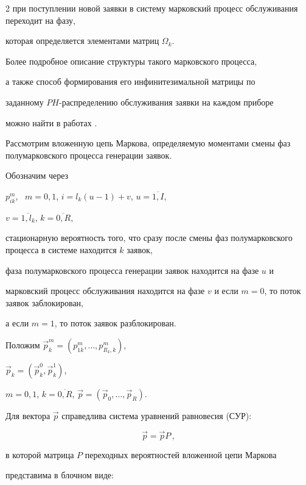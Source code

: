 \begin{multicols}{2}
при поступлении новой заявки в систему марковский процесс обслуживания переходит на фазу,


которая определяется элементами матриц $\Omega_k$.





Более подробное описание структуры такого марковского процесса,


а также способ формирования его инфинитезимальной матрицы по


заданному $PH$-распределению обслуживания заявки на каждом приборе


можно найти в работах \cite{PCh03,PCh04}.





Рассмотрим вложенную цепь Маркова, определяемую моментами смены фаз полумарковского процесса генерации заявок.





Обозначим через


$p^m_{ik}$, \ $m=0,1$,  $i=l_k(u-1)+v$,  $u=\overline{1,I}$,


$v=\overline{1,l_k}$,  $k=\overline{0,R}$,


стационарную вероятность того, что сразу после смены фаз полумарковского процесса в системе находится $k$ заявок,


фаза полумарковского процесса генерации заявок находится на фазе $u$ и


марковский процесс обслуживания находится на фазе $v$ и если $m=0$, то поток заявок заблокирован,


а если $m=1$, то поток заявок разблокирован.


Положим $\vec{p}^m_k=(p^m_{1k},\ldots,p^m_{Il_k,k})$,


$\vec{p}_k = (\vec{p}^0_k,\vec{p}^1_k)$,


 $m=0,1$,  $k=\overline{0,R}$,  $\vec{p}=(\vec{p}_0,\ldots,\vec{p}_R)$.





Для вектора $\vec{p}$ справедлива система уравнений равновесия (СУР):


\begin{equation}


\label{ES}


\vec{p}=\vec{p}P\,,


\end{equation}


в которой матрица $P$ переходных вероятностей вложенной цепи Маркова


представима в блочном виде:


\end{multicols}





